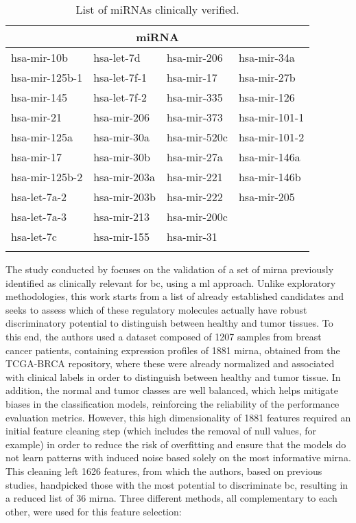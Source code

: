 \begin{table}[h!]
  \centering
  \caption{List of miRNAs clinically verified.}
  \begin{tabular}{llll}
    \toprule
    \multicolumn{4}{c}{\textbf{miRNA} \cite{clinically_important_mirnas}} \\
    \midrule
    hsa-mir-10b    & hsa-let-7d   & hsa-mir-206  & hsa-mir-34a            \\
    hsa-mir-125b-1 & hsa-let-7f-1 & hsa-mir-17   & hsa-mir-27b            \\
    hsa-mir-145    & hsa-let-7f-2 & hsa-mir-335  & hsa-mir-126            \\
    hsa-mir-21     & hsa-mir-206  & hsa-mir-373  & hsa-mir-101-1          \\
    hsa-mir-125a   & hsa-mir-30a  & hsa-mir-520c & hsa-mir-101-2          \\
    hsa-mir-17     & hsa-mir-30b  & hsa-mir-27a  & hsa-mir-146a           \\
    hsa-mir-125b-2 & hsa-mir-203a & hsa-mir-221  & hsa-mir-146b           \\
    hsa-let-7a-2   & hsa-mir-203b & hsa-mir-222  & hsa-mir-205            \\
    hsa-let-7a-3   & hsa-mir-213  & hsa-mir-200c &                        \\
    hsa-let-7c     & hsa-mir-155  & hsa-mir-31   &                        \\
    \bottomrule
    \label{tab:clinically_verified}
  \end{tabular}
\end{table}

The study conducted by \textcite{val_of_mirna_as_biomarker_Rehman_2019} focuses
on the validation of a set of \gls{mirna} previously identified as clinically
relevant for \gls{bc}, using a \gls{ml} approach. Unlike exploratory
methodologies, this work starts from a list of already established candidates
and seeks to assess which of these regulatory molecules actually have robust
discriminatory potential to distinguish between healthy and tumor tissues. To
this end, the authors used a dataset composed of 1207 samples from breast
cancer patients, containing expression profiles of 1881 \gls{mirna}, obtained
from the TCGA-BRCA repository, where these were already normalized and
associated with clinical labels in order to distinguish between healthy and
tumor tissue. In addition, the normal and tumor classes are well balanced,
which helps mitigate biases in the classification models, reinforcing the
reliability of the performance evaluation metrics. However, this high
dimensionality of 1881 features required an initial feature cleaning step
(which includes the removal of null values, for example) in order to reduce the
risk of overfitting and ensure that the models do not learn patterns with
induced noise based solely on the most informative \gls{mirna}. This cleaning
left 1626 features, from which the authors, based on previous studies,
handpicked those with the most potential to discriminate \gls{bc}, resulting in
a reduced list of 36 \gls{mirna}. Three different methods, all complementary to
each other, were used for this feature selection:

